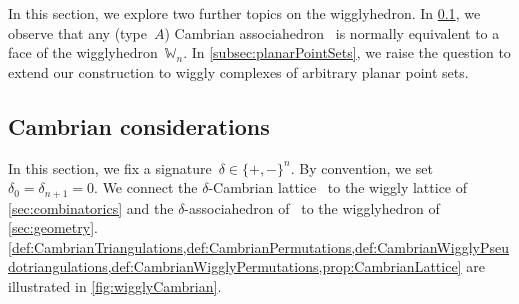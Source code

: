 \documentclass{amsart}
\theoremstyle{definition}
\newcommand{\polytope}[1]{\mathds{#1}} %
\newcommand{\wigglyhedron}{\polytope{W}} %
\begin{document}
In this section, we explore two further topics on the wigglyhedron.
In \cref{subsec:CambrianConsiderations}, we observe that any (type~$A$) Cambrian associahedron~\cite{Reading-CambrianLattices,HohlwegLange} is normally equivalent to a face of the wigglyhedron~$\wigglyhedron_n$.
In \cref{subsec:planarPointSets}, we raise the question to extend our construction to wiggly complexes of arbitrary planar point sets.


\subsection{Cambrian considerations}
\label{subsec:CambrianConsiderations}

In this section, we fix a signature~$\delta \in \{+,-\}^n$. By convention, we set~$\delta_0 = \delta_{n+1} = 0$.
We connect the $\delta$-Cambrian lattice~\cite{Reading-CambrianLattices} to the wiggly lattice of \cref{sec:combinatorics} and the $\delta$-associahedron of~\cite{HohlwegLange} to the wigglyhedron of \cref{sec:geometry}.
\cref{def:CambrianTriangulations,def:CambrianPermutations,def:CambrianWigglyPseudotriangulations,def:CambrianWigglyPermutations,prop:CambrianLattice} are illustrated in \cref{fig:wigglyCambrian}.
\end{document}

